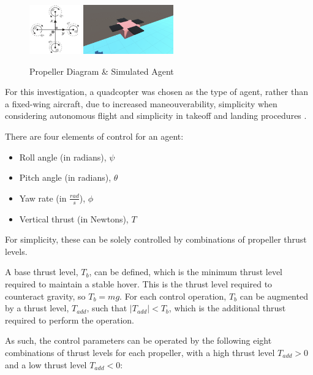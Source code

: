 \documentclass{article}
\begin{document}
\begin{figure}[H]
    \centering
    \includegraphics[height=80px]{prop.png}
    \hspace{1cm}
    \includegraphics[height=80px]{drone-unity.png}
    \caption{Propeller Diagram \& Simulated Agent}
\end{figure}

For this investigation, a quadcopter was chosen as the type of agent, rather than a fixed-wing aircraft, due to increased maneouverability, simplicity when considering autonomous flight and simplicity in takeoff and landing procedures \cite{Thamm}.

There are four elements of control for an agent:
\begin{itemize}
    \item Roll angle (in radians), $\psi$
    \item Pitch angle (in radians), $\theta$
    \item Yaw rate (in $\frac{rad}{s}$), $\phi$
    \item Vertical thrust (in Newtons), $T$
\end{itemize}

For simplicity, these can be solely controlled by combinations of propeller thrust levels. 

A base thrust level, $T_b$, can be defined, which is the minimum thrust level required to maintain a stable hover. This is the thrust level required to counteract gravity, so $T_b = mg$. For each control operation, $T_b$ can be augmented by a thrust level, $T_{add}$, such that $|T_{add}| < T_b$, which is the additional thrust required to perform the operation.

As such, the control parameters can be operated by the following eight combinations of thrust levels for each propeller, with a high thrust level $T_{add} > 0$ and a low thrust level $T_{add} < 0$:
\end{document}
